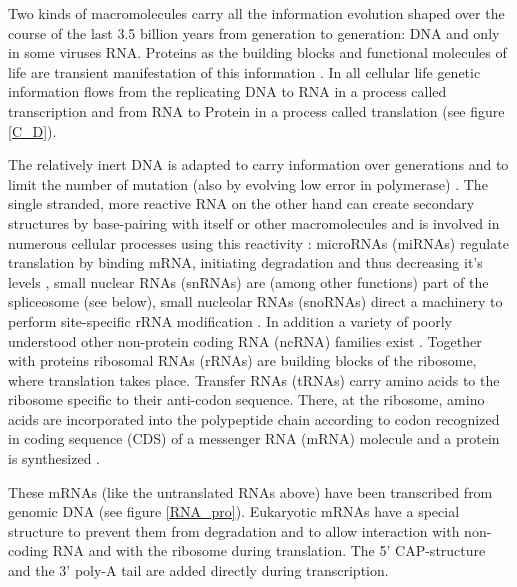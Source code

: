 Two kinds of macromolecules carry all the information evolution shaped
over the course of the last 3.5 billion years from generation to
generation: DNA and only in some viruses RNA. Proteins as the building
blocks and functional molecules of life are transient manifestation of
this information \cite{crick1958biological}. In all cellular life
genetic information flows from the replicating DNA to RNA in a process
called transcription and from RNA to Protein in a process called
translation \cite{pmid5422595} (see figure \ref{C_D}).

The relatively inert DNA is adapted to carry information over
generations and to limit the number of mutation (also by evolving low
error in polymerase) \cite{pmid21821597}. The single stranded, more
reactive RNA on the other hand can create secondary structures by
base-pairing with itself or other macromolecules and is involved in
numerous cellular processes using this reactivity
\cite{pmid21850044}: microRNAs (miRNAs) regulate translation by
binding mRNA, initiating degradation and thus decreasing it's levels
\cite{pmid20703300,pmid11679654}, small nuclear RNAs (snRNAs) are
(among other functions) part of the spliceosome (see below), small
nucleolar RNAs (snoRNAs) direct a machinery to perform site-specific
rRNA modification \cite{pmid19446021}. In addition a variety of poorly
understood other non-protein coding RNA (ncRNA) families exist
\cite{pmid16344563}. Together with proteins ribosomal RNAs (rRNAs) are
building blocks of the ribosome, where translation takes
place. Transfer RNAs (tRNAs) carry amino acids to the ribosome
specific to their anti-codon sequence. There, at the ribosome, amino
acids are incorporated into the polypeptide chain according to codon
recognized in coding sequence (CDS) of a messenger RNA (mRNA) molecule
and a protein is synthesized \cite{pmid4887876}.

These mRNAs (like the untranslated RNAs above) have been transcribed
from genomic DNA (see figure \ref{RNA_pro}). Eukaryotic mRNAs have a
special structure to prevent them from degradation and to allow
interaction with non-coding RNA and with the ribosome during
translation. The 5' CAP-structure and the 3' poly-A tail are added
directly during transcription.


